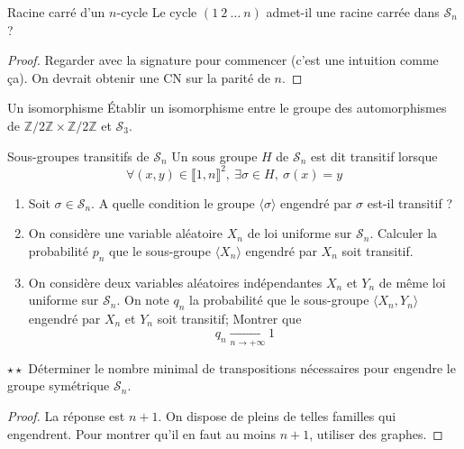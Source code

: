 \documentclass[french,a4paper]{article}
\newcommand{\Z}{\mathbb{Z}}
\theoremstyle{plain}
\theoremstyle{definition}
\theoremstyle{remark}
\begin{document}
\begin{ex}[Moulin.AG.25]{Racine carré d'un $n$-cycle}
	Le cycle $(1\ 2\ \ldots\ n)$ admet-il une racine carrée dans $\mathcal{S}_n$ ?
\end{ex}
\begin{proof}
	Regarder avec la signature pour commencer (c'est une intuition comme ça). On devrait obtenir une CN sur la parité de $n$.
\end{proof}

\begin{ex}[Moulin.AG.26]{Un isomorphisme}
	Établir un isomorphisme entre le groupe des automorphismes de $\Z/2\Z\times\Z/2\Z$ et $\mathcal{S}_3$.
\end{ex}

\begin{ex}[Moulin.AG.27]{Sous-groupes transitifs de $\mathcal{S}_n$}
	Un sous groupe $H$ de $\mathcal{S}_n$ est dit transitif lorsque $$\forall (x,y)\in\llbracket1,n\rrbracket^2,\ \exists\sigma\in H,\ \sigma(x)=y$$
	\begin{enumerate}
		\item Soit $\sigma\in\mathcal{S}_n$. A quelle condition le groupe $\langle\sigma\rangle$ engendré par $\sigma$ est-il transitif ?
		\item On considère une variable aléatoire $X_n$ de loi uniforme sur $\mathcal{S}_n$. Calculer la probabilité $p_n$ que le sous-groupe $\langle X_n\rangle$ engendré par $X_n$ soit transitif.
		\item On considère deux variables aléatoires indépendantes $X_n$ et $Y_n$ de même loi uniforme sur $\mathcal{S}_n$. On note $q_n$ la probabilité que le sous-groupe $\langle X_n,Y_n\rangle$ engendré par $X_n$ et $Y_n$ soit transitif; Montrer que $$q_n\xrightarrow[n\to+\infty]{}1$$
	\end{enumerate}
\end{ex}

\begin{ex}[Moulin.AG.28]{$\star\star$}
	Déterminer le nombre minimal de transpositions nécessaires pour engendre le groupe symétrique $\mathcal{S}_n$.
\end{ex}

\begin{proof}
	La réponse est $n+1$. On dispose de pleins de telles familles qui engendrent. Pour montrer qu'il en faut au moins $n+1$, utiliser des graphes.
\end{proof}
\end{document}
